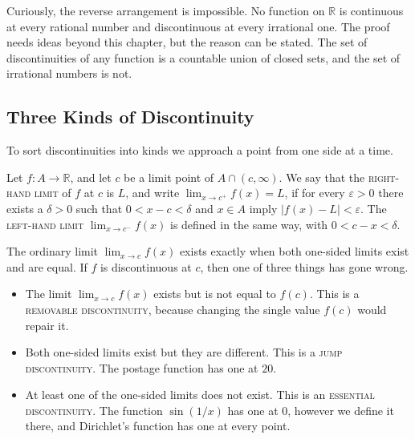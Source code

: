 Curiously, the reverse arrangement is impossible.  No function on $\mathbb{R}$ is continuous at every rational number and discontinuous at every irrational one.  The proof needs ideas beyond this chapter, but the reason can be stated.  The set of discontinuities of any function is a countable union of closed sets, and the set of irrational numbers is not.

\subsection{Three Kinds of Discontinuity}

To sort discontinuities into kinds we approach a point from one side at a time.

\begin{definition}
Let $f : A \to \mathbb{R}$, and let $c$ be a limit point of $A \cap (c, \infty)$.  We say that the \textsc{right-hand limit} of $f$ at $c$ is $L$, and write $\lim_{x \to c^+} f(x) = L$, if for every $\varepsilon > 0$ there exists a $\delta > 0$ such that $0 < x - c < \delta$ and $x \in A$ imply $|f(x) - L| < \varepsilon$.  The \textsc{left-hand limit} $\lim_{x \to c^-} f(x)$ is defined in the same way, with $0 < c - x < \delta$.
\end{definition}

The ordinary limit $\lim_{x \to c} f(x)$ exists exactly when both one-sided limits exist and are equal.  If $f$ is discontinuous at $c$, then one of three things has gone wrong.
\begin{itemize}
	\item The limit $\lim_{x \to c} f(x)$ exists but is not equal to $f(c)$.  This is a \textsc{removable discontinuity}, because changing the single value $f(c)$ would repair it.
	\item Both one-sided limits exist but they are different.  This is a \textsc{jump discontinuity}.  The postage function has one at $20$.
	\item At least one of the one-sided limits does not exist.  This is an \textsc{essential discontinuity}.  The function $\sin(1/x)$ has one at $0$, however we define it there, and Dirichlet's function has one at every point.
\end{itemize}

